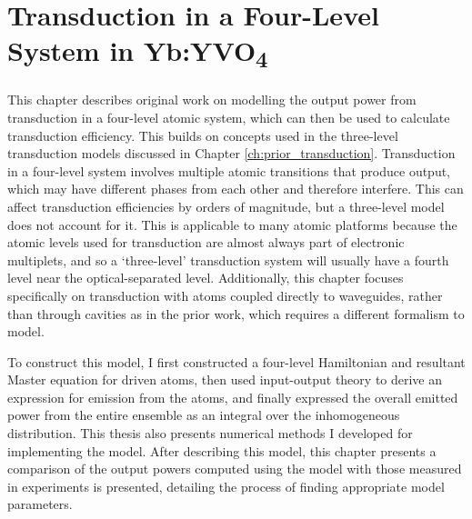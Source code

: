 \chapter{\label{ch:four_level_transduction}Transduction in a Four-Level System in Yb:YVO\textsubscript{4}}

This chapter describes original work on modelling the output power from transduction in a four-level atomic system, which can then be used to calculate transduction efficiency. This builds on concepts used in the three-level transduction models discussed in Chapter \ref{ch:prior_transduction}. Transduction in a four-level system involves multiple atomic transitions that produce output, which may have different phases from each other and therefore interfere. This can affect transduction efficiencies by orders of magnitude, but a three-level model does not account for it. This is applicable to many atomic platforms because the atomic levels used for transduction are almost always part of electronic multiplets, and so a `three-level' transduction system will usually have a fourth level near the optical-separated level. Additionally, this chapter focuses specifically on transduction with atoms coupled directly to waveguides, rather than through cavities as in the prior work, which requires a different formalism to model.

To construct this model, I first constructed a four-level Hamiltonian and resultant Master equation for driven atoms, then used input-output theory to derive an expression for emission from the atoms, and finally expressed the overall emitted power from the entire ensemble as an integral over the inhomogeneous distribution. This thesis also presents numerical methods I developed for implementing the model. After describing this model, this chapter presents a comparison of the output powers computed using the model with those measured in experiments is presented, detailing the process of finding appropriate model parameters.

